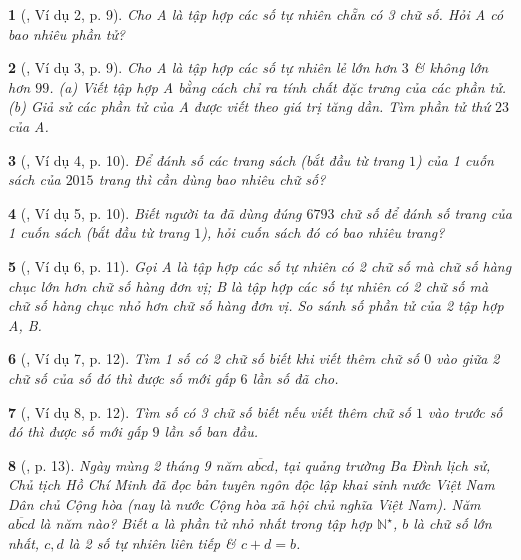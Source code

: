 \documentclass{article}
\newtheorem{baitoan}{}
\begin{document}
\begin{baitoan}[\cite{Binh_boi_duong_Toan_6_tap_1}, Ví dụ 2, p. 9]
	Cho A là tập hợp các số tự nhiên chẵn có 3 chữ số. Hỏi A có bao nhiêu phần tử?
\end{baitoan}

\begin{baitoan}[\cite{Binh_boi_duong_Toan_6_tap_1}, Ví dụ 3, p. 9]
	Cho A là tập hợp các số tự nhiên lẻ lớn hơn $3$ \& không lớn hơn $99$. (a) Viết tập hợp A bằng cách chỉ ra tính chất đặc trưng của các phần tử. (b) Giả sử các phần tử của A được viết theo giá trị tăng dần. Tìm phần tử thứ $23$ của A.
\end{baitoan}

\begin{baitoan}[\cite{Binh_boi_duong_Toan_6_tap_1}, Ví dụ 4, p. 10]
	Để đánh số các trang sách (bắt đầu từ trang $1$) của 1 cuốn sách của $2015$ trang thì cần dùng bao nhiêu chữ số?
\end{baitoan}

\begin{baitoan}[\cite{Binh_boi_duong_Toan_6_tap_1}, Ví dụ 5, p. 10]
	Biết người ta đã dùng đúng $6793$ chữ số để đánh số trang của 1 cuốn sách (bắt đầu từ trang $1$), hỏi cuốn sách đó có bao nhiêu trang?
\end{baitoan}

\begin{baitoan}[\cite{Binh_boi_duong_Toan_6_tap_1}, Ví dụ 6, p. 11]
	Gọi A là tập hợp các số tự nhiên có 2 chữ số mà chữ số hàng chục lớn hơn chữ số hàng đơn vị; B là tập hợp các số tự nhiên có 2 chữ số mà chữ số hàng chục nhỏ hơn chữ số hàng đơn vị. So sánh số phần tử của 2 tập hợp A, B.
\end{baitoan}

\begin{baitoan}[\cite{Binh_boi_duong_Toan_6_tap_1}, Ví dụ 7, p. 12]
	Tìm 1 số có 2 chữ số biết khi viết thêm chữ số $0$ vào giữa 2 chữ số của số đó thì được số mới gấp $6$ lần số đã cho.
\end{baitoan}

\begin{baitoan}[\cite{Binh_boi_duong_Toan_6_tap_1}, Ví dụ 8, p. 12]
	Tìm số có 3 chữ số biết nếu viết thêm chữ số $1$ vào trước số đó thì được số mới gấp $9$ lần số ban đầu.	
\end{baitoan}

\begin{baitoan}[\cite{Binh_boi_duong_Toan_6_tap_1}, p. 13]
	Ngày mùng 2 tháng 9 năm $\overline{abcd}$, tại quảng trường Ba Đình lịch sử, Chủ tịch Hồ Chí Minh đã đọc bản tuyên ngôn độc lập khai sinh nước Việt Nam Dân chủ Cộng hòa (nay là nước Cộng hòa xã hội chủ nghĩa Việt Nam). Năm $\overline{abcd}$ là năm nào? Biết $a$ là phần tử nhỏ nhất trong tập hợp $ \mathbb{N}^\star$, $b$ là chữ số lớn nhất, $c,d$ là 2 số tự nhiên liên tiếp \& $c + d = b$.
\end{baitoan}
\end{document}
